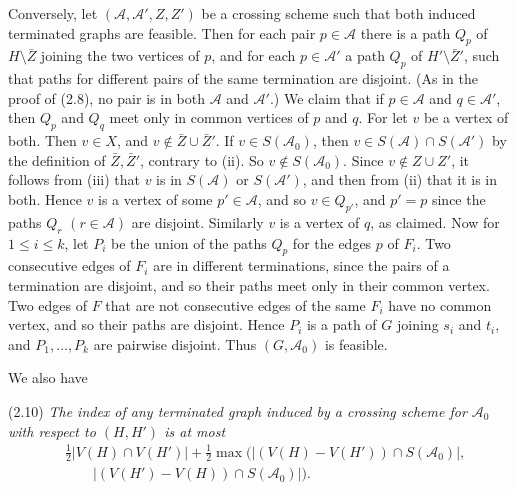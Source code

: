 {Conversely, let $(\mathscr{A}, \mathscr{A}', Z, Z')$ be a crossing scheme such that both induced
terminated graphs are feasible. Then for each pair $p \in \mathscr{A}$ there is a path $Q_p$ of
$H \setminus \bar Z$ joining the two vertices of $p$, and for each $p \in \mathscr{A}'$ a path $Q_p$ of
$H' \setminus \bar Z'$, such that paths for different pairs of the same termination are disjoint.
(As in the proof of (2.8), no pair is in both $\mathscr{A}$ and $\mathscr{A}'$.) We claim that if
$p \in \mathscr{A}$ and $q \in \mathscr{A}'$, then $Q_p$ and $Q_q$ meet only in common vertices of $p$
and $q$. For let $v$ be a vertex of both. Then $v \in X$, and $v \notin \bar Z \cup \bar Z'$. If
$v \in S(\mathscr{A}_0)$, then $v \in S(\mathscr{A}) \cap S(\mathscr{A}')$ by the definition of
$\bar Z, \bar Z'$, contrary to (ii). So $v \notin S(\mathscr{A}_0)$. Since $v \notin Z \cup Z'$, it
follows from (iii) that $v$ is in $S(\mathscr{A})$ or $S(\mathscr{A}')$, and then from (ii) that it is
in both. Hence $v$ is a vertex of some $p' \in \mathscr{A}$, and so $v \in Q_{p'}$, and $p' = p$
since the paths $Q_r$ $(r \in \mathscr{A})$ are disjoint. Similarly $v$ is a vertex of $q$, as
claimed. Now for $1 \le i \le k$, let $P_i$ be the union of the paths $Q_p$ for the edges $p$ of
$F_i$. Two consecutive edges of $F_i$ are in different terminations, since the pairs of a termination
are disjoint, and so their paths meet only in their common vertex. Two edges of $F$ that are not
consecutive edges of the same $F_i$ have no common vertex, and so their paths are disjoint. Hence
$P_i$ is a path of $G$ joining $s_i$ and $t_i$, and $P_1, \dots, P_k$ are pairwise disjoint. Thus
$(G, \mathscr{A}_0)$ is feasible.}

We also have

\stmt
(2.10) \textit{The index of any terminated graph induced by a crossing scheme for $\mathscr{A}_0$ with respect to $(H, H')$ is at most}
\begin{align*}
&\tfrac{1}{2} |V(H) \cap V(H')| + \tfrac{1}{2} \max(|(V(H) - V(H')) \cap S(\mathscr{A}_0)|, \\
&\qquad |(V(H') - V(H)) \cap S(\mathscr{A}_0)|).
\end{align*}
